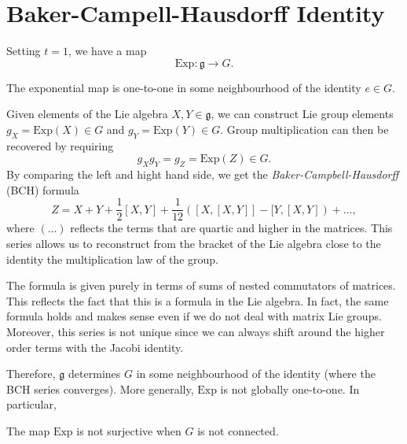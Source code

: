 
\section{Baker-Campell-Hausdorff Identity}%
\label{sec:baker_campell_hausdorff_identity}

Setting $t = 1$, we have a map
\begin{equation}
  \text{Exp}\colon \mathfrak{g} \to G.
\end{equation}
\begin{claim}
  The exponential map is one-to-one in some neighbourhood of the identity $e\in G$.
\end{claim}
Given elements of the Lie algebra $X, Y \in \mathfrak{g}$, we can construct Lie group elements $g_X = \text{Exp}(X) \in G$ and $g_Y = \text{Exp}(Y) \in G$.
Group multiplication can then be recovered by requiring
\begin{equation}
  g_X g_Y = g_Z = \text{Exp}(Z) \in G.
\end{equation}
By comparing the left and hight hand side, we get the \emph{Baker-Campbell-Hausdorff} (BCH) formula
\begin{equation}
  \label{eq:BCH-formula}
  Z = X + Y + \frac{1}{2}[X, Y] + \frac{1}{12}([X, [X, Y]] - [Y, [X, Y]) + \dots,
\end{equation}
where $(\dots)$ reflects the terms that are quartic and higher in the matrices.
This series allows us to reconstruct from the bracket of the Lie algebra close to the identity the multiplication law of the group.
\begin{leftbar}
  \begin{remark}
    The formula is given purely in terms of sums of nested commutators of matrices. This reflects the fact that this is a formula in the Lie algebra. In fact, the same formula holds and makes sense even if we do not deal with matrix Lie groups.
    Moreover, this series is not unique since we can always shift around the higher order terms with the Jacobi identity.
  \end{remark}
\end{leftbar}
Therefore, $\mathfrak{g}$ determines $G$ in some neighbourhood of the identity (where the BCH series converges). More generally, $\text{Exp}$ is not globally one-to-one. In particular,
\begin{claim}
  The map $\text{Exp}$ is not surjective when $G$ is not connected.
\end{claim}
